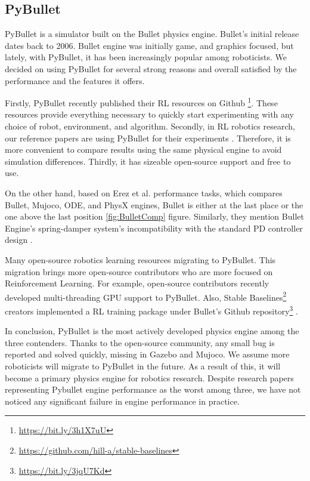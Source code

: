 \subsection{PyBullet}

PyBullet is a simulator built on the Bullet physics engine. Bullet’s initial release dates back to 2006. Bullet engine was initially game, and graphics focused, but lately, with PyBullet, it has been increasingly popular among roboticists. We decided on using PyBullet for several strong reasons and overall satisfied by the performance and the features it offers. 

Firstly, PyBullet recently published their RL resources on Github \footnote{\url{https://bit.ly/3h1X7uU}}. These resources provide everything necessary to quickly start experimenting with any choice of robot, environment, and algorithm. Secondly, in RL robotics research, our reference papers are using PyBullet for their experiments \cite{Quillen2018} \cite{Breyer2018}. Therefore, it is more convenient to compare results using the same physical engine to avoid simulation differences. Thirdly, it has sizeable open-source support and free to use. 

On the other hand, based on Erez et al. performance tasks, which compares Bullet, Mujoco, ODE, and PhysX engines, Bullet is either at the last place or the one above the last position \ref{fig:BulletComp} figure. Similarly, they mention Bullet Engine’s spring-damper system's incompatibility with the standard PD controller design \cite{Erez2015}.

Many open-source robotics learning resources migrating to PyBullet. This migration brings more open-source contributors who are more focused on Reinforcement Learning. For example, open-source contributors recently developed multi-threading GPU support to PyBullet. Also, Stable Baselines\footnote{\url{https://github.com/hill-a/stable-baselines}} creators implemented a RL training package under Bullet’s Github repository\footnote{\url{https://bit.ly/3jqU7Kd}} \cite{stable-baselines}. 

In conclusion, PyBullet is the most actively developed physics engine among the three contenders. Thanks to the open-source community, any small bug is reported and solved quickly, missing in Gazebo and Mujoco. We assume more roboticists will migrate to PyBullet in the future. As a result of this, it will become a primary physics engine for robotics research. Despite research papers representing Pybullet engine performance as the worst among three, we have not noticed any significant failure in engine performance in practice.

